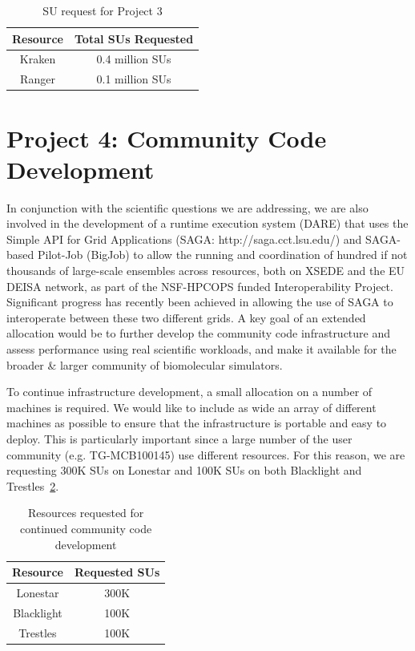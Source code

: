 \documentclass[a4paper,11pt]{article}
\newcommand{\up}{\vspace*{-1em}}
\begin{document}
\begin{table}[!h]
\begin{center}
\begin{tabular}{|c|c| }
\hline 
Resource & Total SUs Requested \\ 
\hline
Kraken   & 0.4 million SUs \\
\hline
Ranger   & 0.1 million SUs \\
\hline
\end{tabular}
\end{center}
  \caption{SU request for Project 3}\label{table:project3}
\up
\end{table}



\section{Project 4: Community Code Development}
In conjunction with the scientific questions we are addressing, we are also involved in the development of a runtime execution system (DARE) that uses the Simple API for Grid Applications (SAGA: http://saga.cct.lsu.edu/) and SAGA-based Pilot-Job (BigJob) to allow the running and coordination of hundred if not thousands of large-scale ensembles across resources, both on XSEDE and the EU DEISA network, as part of the NSF-HPCOPS funded Interoperability Project. Significant progress has recently been achieved in allowing the use of SAGA to interoperate between these two different grids.  A key goal of an extended allocation would be to further develop the community code infrastructure and assess performance using real scientific workloads, and make it available for the broader \& larger community of biomolecular simulators.

To continue infrastructure development, a small allocation on a number of machines is required. We would like to include as wide an array of different machines as possible to ensure that the infrastructure is portable and easy to deploy. This is particularly important since a large number of the user community (e.g. TG-MCB100145) use different resources. For this reason, we are requesting 300K SUs
 on Lonestar and 100K SUs on both Blacklight and Trestles~\ref{table:Infrastructure}.

\begin{table}[!h]
\begin{center}
\begin{tabular}{|c| c | }
\hline 
Resource & Requested SUs\\ 
\hline
Lonestar  &  300K \\
\hline
Blacklight &  100K \\
\hline
Trestles  &  100K \\
\hline
\end{tabular}
\end{center}
  \caption{\small Resources requested for continued community code development}\label{table:Infrastructure}
\up
\end{table}
\end{document}
